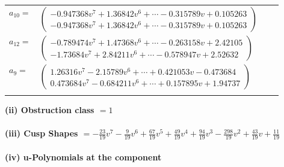 \documentclass[1p]{elsarticle_modified}
\theoremstyle{definition}
\begin{document}
\begin{tabular}{m{7pt} m{180pt} m{7pt} m{180pt} }
\flushright $a_{10}=$&$\begin{pmatrix}-0.947368 v^{7}+1.36842 v^{6}+\cdots-0.315789 v+0.105263\\-0.947368 v^{7}+1.36842 v^{6}+\cdots-0.315789 v+0.105263\end{pmatrix}$ \\
\flushright $a_{12}=$&$\begin{pmatrix}-0.789474 v^{7}+1.47368 v^{6}+\cdots-0.263158 v+2.42105\\-1.73684 v^{7}+2.84211 v^{6}+\cdots-0.578947 v+2.52632\end{pmatrix}$ \\
\flushright $a_{9}=$&$\begin{pmatrix}1.26316 v^{7}-2.15789 v^{6}+\cdots+0.421053 v-0.473684\\0.473684 v^{7}-0.684211 v^{6}+\cdots+0.157895 v+1.94737\end{pmatrix}$\\&\end{tabular}
\flushleft \textbf{(ii) Obstruction class $= 1$}\\~\\
\flushleft \textbf{(iii) Cusp Shapes $= -\frac{23}{19} v^7-\frac{9}{19} v^6+\frac{67}{19} v^5+\frac{49}{19} v^4+\frac{94}{19} v^3-\frac{298}{19} v^2+\frac{43}{19} v+\frac{11}{19}$}\\~\\
\newpage\renewcommand{\arraystretch}{1}
\flushleft \textbf{(iv) u-Polynomials at the component}\newline \\
\end{document}
